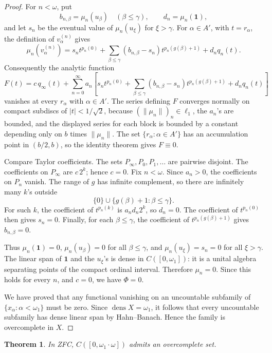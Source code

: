 \documentclass[11pt]{article}
\newtheorem{theorem}{Theorem}
\newcommand{\one}{\mathbf 1}
\begin{document}
\begin{proof}
For \(n<\omega\), put
\[
   b_{n,\beta}=\mu_n(u_\beta)\quad(\beta\leq\gamma),\qquad
   d_n=\mu_n(\one),
\]
and let \(s_n\) be the eventual value of \(\mu_n(u_\xi)\) for
\(\xi>\gamma\).  For \(\alpha\in A'\), with \(t=r_\alpha\), the definition of
\(v_\alpha^{(n)}\) gives
\[
 \mu_n(v_\alpha^{(n)})
   =s_n t^{p_n(0)}
    +\sum_{\beta\leq\gamma}(b_{n,\beta}-s_n)
       t^{p_n(g(\beta)+1)}
    +d_n q_n(t).
\]
Consequently the analytic function
\[
   F(t)=c\,q_\infty(t)+
        \sum_{n=0}^{\infty} a_n\left[
        s_n t^{p_n(0)}
        +\sum_{\beta\leq\gamma}(b_{n,\beta}-s_n)
           t^{p_n(g(\beta)+1)}
        +d_n q_n(t)\right]
\]
vanishes at every \(r_\alpha\) with \(\alpha\in A'\).  The series defining
\(F\) converges normally on compact subdiscs of \(|t|<1/\sqrt2\), because
\((\|\mu_n\|)_n\in\ell_1\), the \(a_n\)'s are bounded, and the displayed
series for each block is bounded by a constant depending only on \(b\) times
\(\|\mu_n\|\).  The set \(\{r_\alpha:\alpha\in A'\}\) has an accumulation
point in \((b/2,b)\), so the identity theorem gives \(F\equiv0\).

Compare Taylor coefficients.  The sets \(P_\infty,P_0,P_1,\ldots\) are
pairwise disjoint.  The coefficients on \(P_\infty\) are \(c\,2^k\); hence
\(c=0\).  Fix \(n<\omega\).  Since \(a_n>0\), the coefficients on \(P_n\)
vanish.  The range of \(g\) has infinite complement, so there are infinitely
many \(k\)'s outside
\[
   \{0\}\cup\{g(\beta)+1:\beta\leq\gamma\}.
\]
For such \(k\), the coefficient of \(t^{p_n(k)}\) is \(a_n d_n2^k\), so
\(d_n=0\).  The coefficient of \(t^{p_n(0)}\) then gives \(s_n=0\).  Finally,
for each \(\beta\leq\gamma\), the coefficient of
\(t^{p_n(g(\beta)+1)}\) gives \(b_{n,\beta}=0\).

Thus \(\mu_n(\one)=0\), \(\mu_n(u_\beta)=0\) for all \(\beta\leq\gamma\), and
\(\mu_n(u_\xi)=s_n=0\) for all \(\xi>\gamma\).  The linear span of
\(\one\) and the \(u_\xi\)'s is dense in \(C([0,\omega_1])\): it is a unital
algebra separating points of the compact ordinal interval.  Therefore
\(\mu_n=0\).  Since this holds for every \(n\), and \(c=0\), we have
\(\Phi=0\).

We have proved that any functional vanishing on an uncountable subfamily of
\(\{x_\alpha:\alpha<\omega_1\}\) must be zero.  Since \(\operatorname{dens}X
=\omega_1\), it follows that every uncountable subfamily has dense linear
span by Hahn--Banach.  Hence the family is overcomplete in \(X\).
\end{proof}

\begin{theorem}\label{thm:ordinal}
In ZFC, \(C([0,\omega_1\cdot\omega])\) admits an overcomplete set.
\end{theorem}
\end{document}
